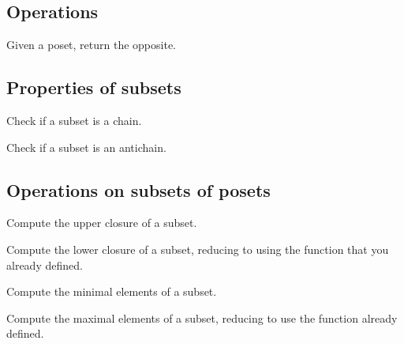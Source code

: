 \subsection{Operations}


\begin{exercise}
Given a poset, return the opposite.
\end{exercise}

\subsection{Properties of subsets}


\begin{exercise}
Check if a subset is a chain.
\end{exercise}

\begin{exercise}
Check if a subset is an antichain.
\end{exercise}

\subsection{Operations on subsets of posets}

\begin{exercise}
Compute the upper closure of a subset.

\end{exercise}


\begin{exercise}
Compute the lower closure of a subset, reducing to
using the function  that you
already defined.

\end{exercise}



\begin{exercise}
Compute the minimal elements of a subset.


\end{exercise}


\begin{exercise}
Compute the maximal elements of a subset, reducing
to use the function  already defined.


\end{exercise}


